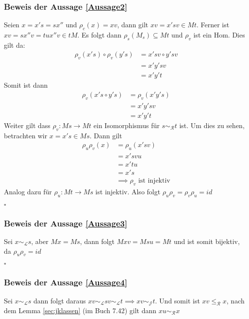 \documentclass[12pt, german]{article}
\newcommand{\grel}{\sim_{\mathcal{L}}}
\newcommand{\grer}{\sim_{\mathcal{R}}}
\newcommand{\grej}{\sim_{\mathcal{J}}}
\newcommand{\lgrereq}{\leqslant_{\mathcal{R}}}
\newcommand{\bewiesen}{
	
	\begin{flushright}
		$\square$  \\
\end{flushright}}
\begin{document}
	\subsubsection{Beweis der Aussage \ref{Aussage2}}
	Seien $x = x's = sx''$ und $\rho_c(x) = xv$, dann gilt $xv = x'sv \in Mt$. Ferner ist $xv = sx''v = tux''v \in tM$. 
	Es folgt dann $\rho_s(M_s) \subseteq Mt$ und $\rho_v$ ist ein Hom. Dies gilt da:  
	\begin{align*}
		\rho_v(x's)\circ \rho_v(y's) &= x'sv \circ y'sv \\ 
		&= x'y'sv \\
		&= x'y't
	\end{align*}
	Somit ist dann 
	\begin{align*}
		\rho_v(x's \circ y's) &= \rho_v(x'y's) \\
		&= x'y'sv \\
		&= x'y't
	\end{align*}
	Weiter gilt dass $\rho_v: Ms \to Mt$ ein Isomorphismus für $s \grer t$ ist. Um dies zu sehen, betrachten wir $x = x's \in Ms$. Dann gilt 
	\begin{align*}
		\rho_u\rho_v(x) &= \rho_u(x'sv) \\
		&= x'svu \\
		&= x'tu \\
		&=x's \\
		&\implies \rho_v \text{ ist injektiv}
	\end{align*}
	Analog dazu für $\rho_u: Mt \to Ms$ ist injektiv. Also folgt $\rho_u\rho_v = \rho_v\rho_u = id$
	\bewiesen
	
	\subsubsection{Beweis der Aussage \ref{Aussage3}}
	Sei $x \grel s$, aber $Mx = Ms$, dann folgt $Mxv = Msu = Mt$ und ist somit bijektiv, da $\rho_u\rho_v = id$
	\bewiesen
	
	\subsubsection{Beweis der Aussage \ref{Aussage4}}
	Sei $x\grel s$ dann folgt daraus $ xv \grel sv \grel t \implies xv \grej t$. Und somit ist $xv \lgrereq x$, nach dem Lemma \ref{sec:jklassen} (im Buch 7.42) gilt dann $xu \grer x$ 
	
	
\end{document}
